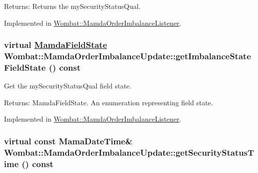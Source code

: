 \begin{Desc}
\item[Returns:]Returns the my\-Security\-Status\-Qual. \end{Desc}


Implemented in \hyperlink{classWombat_1_1MamdaOrderImbalanceListener_0c165617508c80658877e499eb3c2e41}{Wombat::Mamda\-Order\-Imbalance\-Listener}.\hypertarget{classWombat_1_1MamdaOrderImbalanceUpdate_2732f39cf68ac3b1a9304b0c5270a180}{
\subsubsection[getImbalanceStateFieldState]{\setlength{\rightskip}{0pt plus 5cm}virtual \hyperlink{namespaceWombat_93aac974f2ab713554fd12a1fa3b7d2a}{Mamda\-Field\-State} Wombat::Mamda\-Order\-Imbalance\-Update::get\-Imbalance\-State\-Field\-State () const}}
\label{classWombat_1_1MamdaOrderImbalanceUpdate_2732f39cf68ac3b1a9304b0c5270a180}


Get the my\-Security\-Status\-Qual field state. 

\begin{Desc}
\item[Returns:]Mamda\-Field\-State. An enumeration representing field state. \end{Desc}


Implemented in \hyperlink{classWombat_1_1MamdaOrderImbalanceListener_63cc4f92d2bbd8f122922d5f4fb2932b}{Wombat::Mamda\-Order\-Imbalance\-Listener}.\hypertarget{classWombat_1_1MamdaOrderImbalanceUpdate_f98ca9c11930cf69c7d7f80ea5c42a32}{
\subsubsection[getSecurityStatusTime]{\setlength{\rightskip}{0pt plus 5cm}virtual const Mama\-Date\-Time\& Wombat::Mamda\-Order\-Imbalance\-Update::get\-Security\-Status\-Time () const}}
\label{classWombat_1_1MamdaOrderImbalanceUpdate_f98ca9c11930cf69c7d7f80ea5c42a32}


